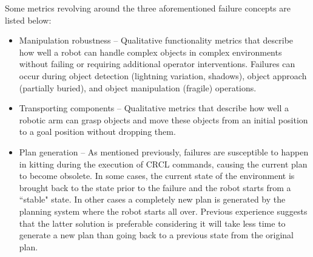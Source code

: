 Some metrics revolving around the three aforementioned failure concepts are listed below:
\begin{itemize}
\item \sf Manipulation robustness \rm -- Qualitative functionality metrics that describe how well a robot can handle complex objects in complex environments without failing or requiring additional operator interventions. Failures can occur during object detection (lightning variation, shadows), object approach (partially buried), and object manipulation (fragile) operations.\\
\item \sf Transporting components \rm -- Qualitative metrics that describe how well a robotic arm can grasp objects and move these objects from an initial position to a goal position without dropping them.\\
\item \sf Plan generation \rm -- As mentioned previously, failures are susceptible to happen in kitting during the execution of CRCL commands, causing the current plan to become obsolete. In some cases, the current state of the environment is brought back to the state prior to the failure and the robot starts from a ``stable" state. In other cases a completely new plan is generated by the planning system where the robot starts all over. Previous experience suggests that the latter solution is preferable considering it will take less time to generate a new plan than going back to a previous state from the original plan.
    

\end{itemize}
